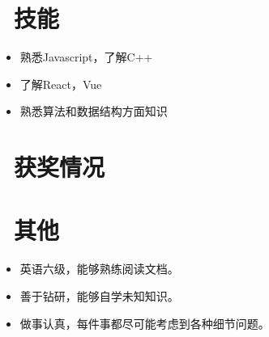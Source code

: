 \documentclass{resume}
\begin{document}

\section{\faCogs\ 技能}
\begin{itemize}[parsep=0.5ex]
  \item 熟悉Javascript，了解C++
  \item 了解React，Vue
  \item 熟悉算法和数据结构方面知识
\end{itemize}

\section{\faHeartO\ 获奖情况}

\section{\faInfo\ 其他}
\begin{itemize}[parsep=0.5ex]
  \item 英语六级，能够熟练阅读文档。
  \item 善于钻研，能够自学未知知识。
  \item 做事认真，每件事都尽可能考虑到各种细节问题。
\end{itemize}

%
%
\end{document}
